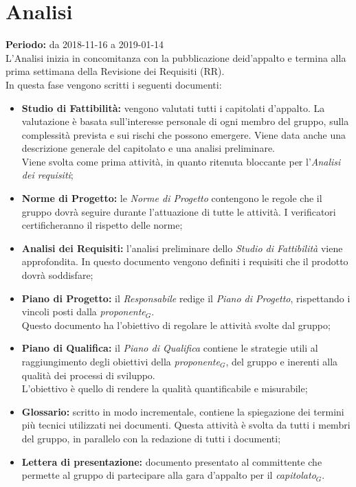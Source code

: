 \section{Analisi}
\textbf{Periodo:} da 2018-11-16 a 2019-01-14\\L'Analisi inizia in concomitanza con la pubblicazione deid’appalto e termina alla prima settimana della  Revisione dei Requisiti (RR).\\
In questa fase vengono scritti i seguenti documenti:
\begin{itemize}
    \item \textbf{Studio di Fattibilità:} vengono valutati tutti i capitolati d'appalto. La valutazione è basata sull'interesse personale di ogni membro del gruppo, sulla complessità prevista e sui rischi che possono emergere. Viene data anche una descrizione generale del capitolato e una analisi preliminare.\\Viene svolta come prima attività, in quanto ritenuta bloccante per l'\textit{Analisi dei requisiti};
    \item \textbf{Norme di Progetto:} le \textit{Norme di Progetto} contengono le regole che il gruppo dovrà seguire durante l'attuazione di tutte le attività. I verificatori certificheranno il rispetto delle norme;
    \item \textbf{Analisi dei Requisiti:} l'analisi preliminare dello \textit{Studio di Fattibilità} viene approfondita.
    In questo documento vengono definiti i requisiti che il prodotto dovrà soddisfare;
    \item \textbf{Piano di Progetto:} il \textit{Responsabile} redige il \textit{Piano di Progetto}, rispettando i vincoli posti dalla \textit{proponente$_{G}$}.\\Questo documento ha l'obiettivo di regolare le attività svolte dal gruppo;
    \item \textbf{Piano di Qualifica:} il \textit{Piano di Qualifica} contiene le strategie utili al raggiungimento degli obiettivi della \textit{proponente$_{G}$}, del gruppo e inerenti alla qualità dei processi di sviluppo.\\L'obiettivo è quello di rendere la qualità quantificabile e misurabile;
    \item \textbf{Glossario:} scritto in modo incrementale, contiene la spiegazione dei termini più tecnici utilizzati nei documenti. Questa attività è svolta da tutti i membri del gruppo, in parallelo con la redazione di tutti i documenti;
    \item \textbf{Lettera di presentazione:} documento presentato al committente che permette al gruppo di partecipare alla gara d’appalto per il \textit{capitolato$_{G}$}.
\end{itemize}
